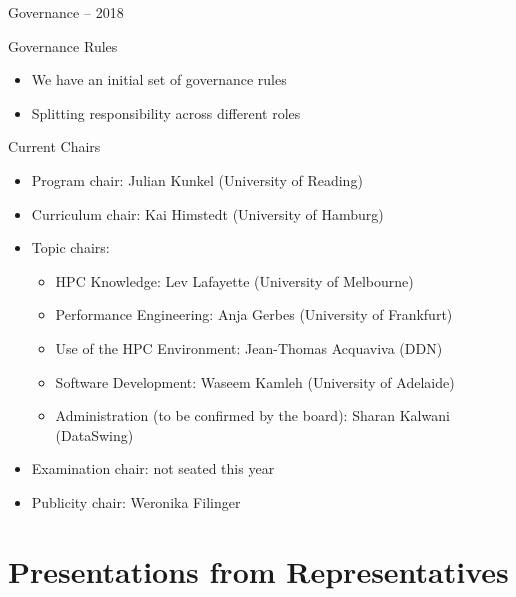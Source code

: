 \documentclass[compress,aspectratio=169]{beamer}
\begin{document}
\begin{frame}{Governance -- 2018}
    \vspace*{-0.3em}

  \begin{block}{Governance Rules}
    \vspace*{-0.5em}
    \begin{itemize}
      \item We have an initial set of governance rules
      \item Splitting responsibility across different roles
    \end{itemize}
  \end{block}

  \vspace*{-1em}

  \begin{block}{Current Chairs}
  \vspace*{-0.5em}
  \begin{itemize}
    \item Program chair: Julian Kunkel (University of Reading)
    \item Curriculum chair: Kai Himstedt (University of Hamburg)
    \item  Topic chairs:
    \begin{itemize}
      \item HPC Knowledge: Lev Lafayette (University of Melbourne)
      \item Performance Engineering: Anja Gerbes (University of Frankfurt)
      \item Use of the HPC Environment: Jean-Thomas Acquaviva (DDN)
      \item Software Development: Waseem Kamleh (University of Adelaide)
			\item Administration (to be confirmed by the board): Sharan Kalwani (DataSwing)
    \end{itemize}
    \item Examination chair: not seated this year
    \item Publicity chair: Weronika Filinger
  \end{itemize}
  \end{block}
\end{frame}

\section{Presentations from Representatives}
\sectionIntroHidden
\end{document}
